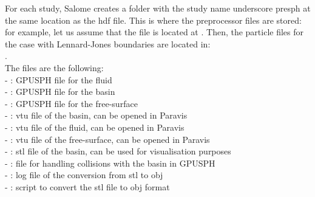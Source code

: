\documentclass{../GPUSPHtemplate}
\begin{document}
\begin{enumerate}
\begin{itemize}
    For each study, Salome creates a folder with the study name underscore presph at the same location as the hdf file.
    This is where the preprocessor files are stored: for example, let us assume that the  file
    is located at .
    Then, the particle files for the case with Lennard-Jones boundaries are located in:\\
    . \\
    The files are the following:\\
    - :  GPUSPH file for the fluid\\
    - : GPUSPH file for the basin\\
    - : GPUSPH file for the free-surface\\
    - : vtu file of the basin, can be opened in Paravis\\
    - : vtu file of the fluid, can be opened in Paravis\\
    - : vtu file of the free-surface, can be opened in Paravis\\
    - : stl file of the basin, can be used for visualisation purposes\\
    - : file for handling collisions with the basin in GPUSPH\\
    - : log file of the conversion from stl to obj\\
    - : script to convert the stl file to obj format
  \end{itemize}
  

\end{enumerate}
\end{document}
